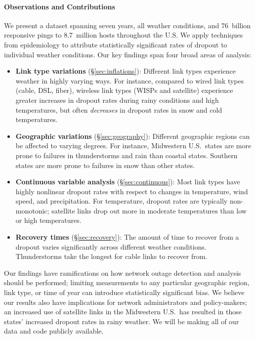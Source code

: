 \paragraph{Observations and Contributions}
%
We present a dataset spanning seven years, all weather conditions, and
76~billion responsive pings to 8.7~million hosts throughout the U.S. 
%
We apply techniques from epidemiology to attribute statistically
significant rates of dropout to individual weather conditions.
%
Our key findings span four broad areas of analysis:

\begin{itemize}

\item \textbf{Link type variations} (\S\ref{sec:inflations}): Different link
types experience weather in highly varying ways.  For instance, compared to
wired link types (cable, DSL, fiber), wireless link types (WISPs and satellite)
experience greater increases in dropout rates during rainy conditions and high
temperatures, but often \emph{decreases} in dropout rates in snow and cold
temperatures.

\item \textbf{Geographic variations} (\S\ref{sec:geography}): Different
geographic regions can be affected to varying degrees.  For instance,
Midwestern U.S.~states are more prone to failures in thunderstorms and rain
than coastal states.  Southern states are more prone to failures in snow than
other states.

\item \textbf{Continuous variable analysis} (\S\ref{sec:continuous}): Most link
types have highly nonlinear dropout rates with respect to changes in
temperature, wind speed, and precipitation.  For temperature, dropout rates are
typically non-monotonic; satellite links drop out more in moderate temperatures
than low or high temperatures.

\item \textbf{Recovery times} (\S\ref{sec:recovery}): The amount of time to
recover from a dropout varies significantly across different weather
conditions.  Thunderstorms take the longest for cable links to recover from.

\end{itemize}

Our findings have ramifications on how network outage detection and analysis
should be performed; limiting measurements to any particular geographic region,
link type, or time of year can introduce statistically significant bias.
%
We believe our results also have implications for network administrators and
policy-makers; an increased use of satellite links in the Midwestern U.S.~has
resulted in those states' increased dropout rates in rainy weather.
%
We will be making all of our data and code publicly available.

